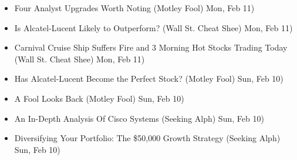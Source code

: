 \documentclass[11pt,asymmetric]{article}
\begin{document}
\begin{itemize}
\item Four Analyst Upgrades Worth Noting (Motley Fool) Mon, Feb 11)
\item Is Alcatel-Lucent Likely to Outperform? (Wall St. Cheat Shee) Mon, Feb 11)
\item Carnival Cruise Ship Suffers Fire and 3 Morning Hot Stocks Trading Today (Wall St. Cheat Shee) Mon, Feb 11)
\item Has Alcatel-Lucent Become the Perfect Stock? (Motley Fool) Sun, Feb 10)
\item A Fool Looks Back (Motley Fool) Sun, Feb 10)
\item An In-Depth Analysis Of Cisco Systems (Seeking Alph) Sun, Feb 10)
\item Diversifying Your Portfolio: The \$50,000 Growth Strategy (Seeking Alph) Sun, Feb 10)
\end{itemize}
\end{document}
